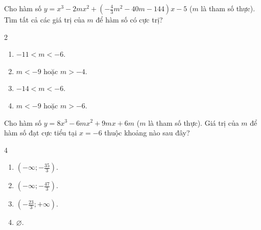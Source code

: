 \begin{baitap}
	Cho hàm số $y=x^3-2mx^2+\left(-\frac{4}{3}m^2-40m-144\right)x-5$ ($m$ là tham số thực). Tìm tất cả các giá trị của $m$ để hàm số có cực trị?
	\begin{multicols}{2}
		\begin{enumerate}[\quad \bf A.]
			\item $-11 < m < -6$.
			\item $m < -9$ hoặc $m > -4$.
			\item $-14 < m < -6$.
			\item $m < -9$ hoặc $m > -6$.
		\end{enumerate}
	\end{multicols}
\end{baitap}
\begin{baitap}
	Cho hàm số $y=8x^3-6mx^2+9mx+6m$ ($m$ là tham số thực). Giá trị của $m$ để hàm số đạt cực tiểu tại $x=-6$ thuộc khoảng nào sau đây?
	\begin{multicols}{4}
		\begin{enumerate}[\quad \bf A.]
			\item $\left(-\infty; -\frac{35}{3}\right)$.
			\item $\left(-\infty; -\frac{47}{3}\right)$.
			\item $\left(-\frac{23}{3}; +\infty\right)$.
			\item $\varnothing$.
		\end{enumerate}
	\end{multicols}
\end{baitap}


